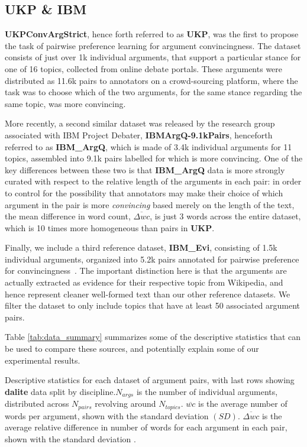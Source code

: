 \documentclass[runningheads]{llncs}
\begin{document}
\subsection{UKP \& IBM}
\textbf{UKPConvArgStrict}\cite{habernal_which_2016}, hence forth referred to as 
\textbf{UKP}, was the first to propose the task of pairwise preference learning 
for argument convincingness. 
The dataset consists of just over 1k individual arguments, that support a 
particular stance for one of 16 topics, collected from online debate portals. 
These arguments were distributed as 11.6k pairs to annotators on a 
crowd-sourcing platform, where the task was to choose which of the two 
arguments, for the same stance regarding the same topic, was more convincing. 

More recently, a second similar dataset was released by the research group 
associated with IBM Project Debater, 
\textbf{IBMArgQ-9.1kPairs}\cite{toledo_automatic_2019}, henceforth 
referred to as \textbf{IBM\_ArgQ}, which is made of 3.4k individual arguments 
for 11 topics, assembled into 9.1k pairs labelled for which is more convincing. 
One of the key differences between these two is that \textbf{IBM\_ArgQ} data is 
more strongly curated with respect to the relative length of the arguments in 
each pair: in order to control for the possibility that annotators may make 
their choice of which argument in the pair is more \textit{convincing} based 
merely on the length of the text, the mean difference in word count, 
$\overline{\Delta wc}$, is just 3 words across the entire dataset, which is 10 
times more homogeneous than pairs in \textbf{UKP}.

Finally, we include a third reference dataset, \textbf{IBM\_Evi}, consisting of 
1.5k individual arguments, organized into 5.2k pairs annotated for pairwise 
preference for convincingness~\cite{gleize_are_2019}. The important distinction 
here is that the arguments are actually extracted as evidence for their 
respective topic from Wikipedia, and hence represent cleaner well-formed text 
than our other reference datasets. We filter the dataset to only include topics 
that have at least 50 associated argument pairs.

Table \ref{tab:data_summary} summarizes some of the descriptive statistics that 
can be used to compare these sources, and potentially explain some of our 
experimental results. 

\begin{table}
	\caption{Descriptive statistics for each dataset of argument pairs, with 
		last rows showing \textbf{dalite} data split by discipline.$N_{args}$ 
		is the number of individual arguments, distributed across $N_{pairs}$ 
		revolving around $N_{topics}$. $\overline{wc}$ is the average number of 
		words per argument, shown with the standard deviation $(SD)$. 
		$\overline{\Delta wc}$ is the average relative difference in number of 
		words for each argument in each pair, shown with the standard deviation 
		.}
	\centerline{}
	\label{tab:data_summary}
\end{table}
\end{document}
